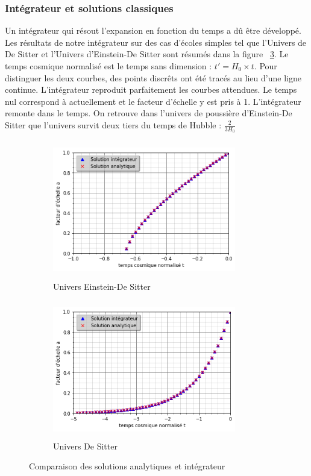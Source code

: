 \documentclass[10pt, a4paper]{report}
\numberwithin{equation}{subsection}
\begin{document}
\subsubsection{Intégrateur et solutions classiques}
Un intégrateur qui résout l'expansion en fonction du temps a dû être développé. Les résultats de notre intégrateur sur des cas d'écoles simples tel que l'Univers de De Sitter et l'Univers d'Einstein-De Sitter sont résumés dans la figure ~\ref{fig:UISC}. Le temps cosmique normalisé est le temps sans dimension : $t' = H_0 \times t$. Pour distinguer les deux courbes, des points discrêts ont été tracés au lieu d'une ligne continue. L'intégrateur reproduit parfaitement les courbes attendues. Le temps nul correspond à actuellement et le facteur d'échelle y est pris à 1. L'intégrateur remonte dans le temps. On retrouve dans l'univers de poussière d'Einstein-De Sitter que l'univers survit deux tiers du temps de Hubble : $\frac{2}{3H_0}$ 

\begin{figure}[]

\begin{subfigure}{0.5\textwidth}
\includegraphics[width=8.0cm,height=6cm]{EDSf.png}
\caption{Univers Einstein-De Sitter}
\label{fig:UEDS}
\end{subfigure}
\begin{subfigure}{0.5\textwidth}
\includegraphics[width=8.0cm,height=6cm]{DSf.png}
\caption{Univers De Sitter}
\label{fig:UDS}
\end{subfigure}

\caption{Comparaison des solutions analytiques et intégrateur}
\label{fig:UISC}
\end{figure}
\end{document}
